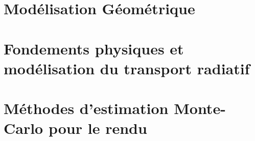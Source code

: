 



\chapter{Modélisation Géométrique}


\chapter{Fondements physiques et modélisation du transport radiatif}


\chapter{Méthodes d'estimation Monte-Carlo pour le rendu}


